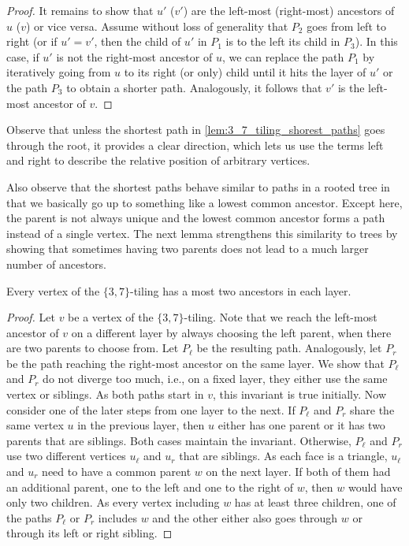 \documentclass[a4paper,english,cleveref,thm-restate]{lipics-v2021}
\begin{document}
\begin{proof}
    It remains to show that $u'$ ($v'$) are the left-most (right-most) ancestors of $u$ ($v$) or vice versa.
    Assume without loss of generality that $P_2$ goes from left to right (or if $u' = v'$, then the child of $u'$ in $P_1$ is to the left its child in $P_3$).
    In this case, if $u'$ is not the right-most ancestor of $u$, we can replace the path $P_1$ by iteratively going from $u$ to its right (or only) child until it hits the layer of $u'$ or the path $P_3$ to obtain a shorter path.
    Analogously, it follows that $v'$ is the left-most ancestor of $v$.
\end{proof}

Observe that unless the shortest path in \cref{lem:3_7_tiling_shorest_paths} goes through the root, it provides a clear direction, which lets us use the terms left and right to describe the relative position of arbitrary vertices.

Also observe that the shortest paths behave similar to paths in a rooted tree in that we basically go up to something like a lowest common ancestor.
Except here, the parent is not always unique and the lowest common ancestor forms a path instead of a single vertex.
The next lemma strengthens this similarity to trees by showing that sometimes having two parents does not lead to a much larger number of ancestors.

\begin{lemma}
    \label{lem:3_7_tiling_at_most_two_ancestors}
    Every vertex of the $\{3, 7\}$-tiling has a most two ancestors in each layer.
\end{lemma}
\begin{proof}
    Let $v$ be a vertex of the $\{3, 7\}$-tiling.
    Note that we reach the left-most ancestor of $v$ on a different layer by always choosing the left parent, when there are two parents to choose from.
    Let $P_\ell$ be the resulting path.
    Analogously, let $P_r$ be the path reaching the right-most ancestor on the same layer.
    We show that $P_\ell$ and $P_r$ do not diverge too much, i.e., on a fixed layer, they either use the same vertex or siblings.
    As both paths start in $v$, this invariant is true initially.
    Now consider one of the later steps from one layer to the next.
    If $P_\ell$ and $P_r$ share the same vertex $u$ in the previous layer, then $u$ either has one parent or it has two parents that are siblings.
    Both cases maintain the invariant.
    Otherwise, $P_\ell$ and $P_r$ use two different vertices $u_\ell$ and $u_r$ that are siblings.
    As each face is a triangle, $u_\ell$ and $u_r$ need to have a common parent $w$ on the next layer.
    If both of them had an additional parent, one to the left and one to the right of $w$, then $w$ would have only two children.
    As every vertex including $w$ has at least three children, one of the paths $P_\ell$ or $P_r$ includes $w$ and the other either also goes through $w$ or through its left or right sibling.
\end{proof}
\end{document}
